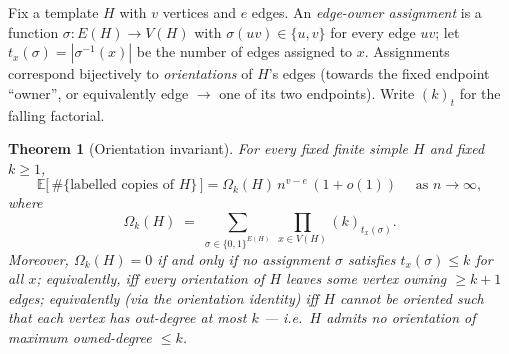 \documentclass[11pt,a4paper]{article}
\newtheorem{theorem}{Theorem}[section]
\theoremstyle{definition}
\theoremstyle{definition}
\begin{document}
Fix a template $H$ with $v$ vertices and $e$ edges. An \emph{edge-owner
assignment} is a function $\sigma: E(H)\to V(H)$ with $\sigma(uv)\in\{u,v\}$ for
every edge $uv$; let $t_x(\sigma) = |\sigma^{-1}(x)|$ be the number of edges assigned
to $x$. Assignments correspond bijectively to \emph{orientations} of $H$'s edges
(towards the fixed endpoint ``owner'', or equivalently edge $\to$ one of its two
endpoints). Write $(k)_t$ for the falling factorial.

\begin{theorem}[Orientation invariant]\label{thm:omega}
For every fixed finite simple $H$ and fixed $k\ge1$,
\[
\mathbb E\bigl[\,\#\{\text{labelled copies of }H\}\,\bigr]
=\Omega_k(H)\,n^{v-e}\,(1+o(1))
\quad\text{ as } n\to\infty,
\]
where
\[
\Omega_k(H)\;=\;\sum_{\sigma\in\{0,1\}^{E(H)}}\
\prod_{x\in V(H)}(k)_{t_x(\sigma)}.
\]
Moreover, $\Omega_k(H)=0$ if and only if \emph{no} assignment $\sigma$ satisfies
$t_x(\sigma)\le k$ for all $x$; equivalently, iff every orientation of $H$ leaves
some vertex owning $\ge k+1$ edges; equivalently (via the orientation identity) iff
$H$ cannot be oriented such that each vertex has out-degree at most $k$ —
i.e.\ $H$ admits no orientation of maximum owned-degree $\le k$.
\end{theorem}
\end{document}
